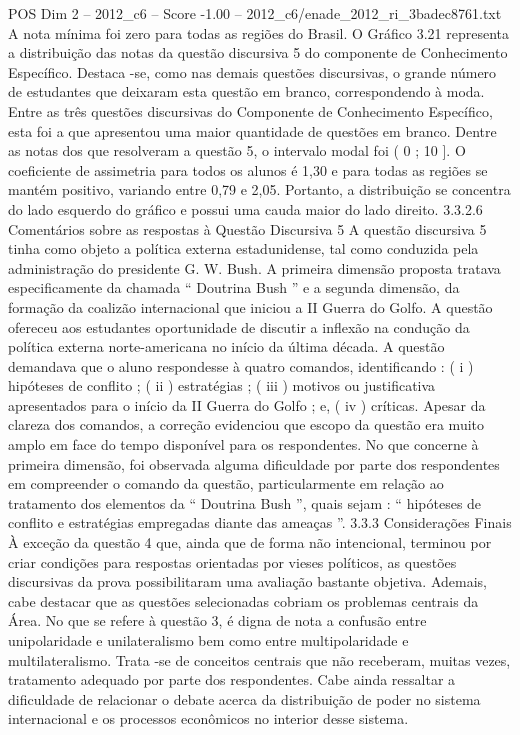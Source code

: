 \begin{textsample}{POS Dim 2 – 2012\_c6 – Score -1.00 – 2012\_c6/enade\_2012\_ri\_3badec8761.txt}
A nota mínima foi zero para todas as regiões do Brasil.
O Gráfico 3.21 representa a distribuição das notas da questão discursiva 5 do componente de Conhecimento Específico.
Destaca -se, como nas demais questões discursivas, o grande número de estudantes que deixaram esta questão em branco, correspondendo à moda.
Entre as três questões discursivas do Componente de Conhecimento Específico, esta foi a que apresentou uma maior quantidade de questões em branco.
Dentre as notas dos que resolveram a questão 5, o intervalo modal foi ( 0 ; 10 ].
O coeficiente de assimetria para todos os alunos é 1,30 e para todas as regiões se mantém positivo, variando entre 0,79 e 2,05.
Portanto, a distribuição se concentra do lado esquerdo do gráfico e possui uma cauda maior do lado direito. 3.3.2.6 Comentários sobre as respostas à Questão Discursiva 5 A questão discursiva 5 tinha como objeto a política externa estadunidense, tal como conduzida pela administração do presidente G.
W.
Bush.
A primeira dimensão proposta tratava especificamente da chamada “ Doutrina Bush ” e a segunda dimensão, da formação da coalizão internacional que iniciou a II Guerra do Golfo.
A questão ofereceu aos estudantes oportunidade de discutir a inflexão na condução da política externa norte-americana no início da última década.
A questão demandava que o aluno respondesse à quatro comandos, identificando : ( i ) hipóteses de conflito ; ( ii ) estratégias ; ( iii ) motivos ou justificativa apresentados para o início da II Guerra do Golfo ; e, ( iv ) críticas.
Apesar da clareza dos comandos, a correção evidenciou que escopo da questão era muito amplo em face do tempo disponível para os respondentes.
No que concerne à primeira dimensão, foi observada alguma dificuldade por parte dos respondentes em compreender o comando da questão, particularmente em relação ao tratamento dos elementos da “ Doutrina Bush ”, quais sejam : “ hipóteses de conflito e estratégias empregadas diante das ameaças ”. 3.3.3 Considerações Finais À exceção da questão 4 que, ainda que de forma não intencional, terminou por criar condições para respostas orientadas por vieses políticos, as questões discursivas da prova possibilitaram uma avaliação bastante objetiva.
Ademais, cabe destacar que as questões selecionadas cobriam os problemas centrais da Área.
No que se refere à questão 3, é digna de nota a confusão entre unipolaridade e unilateralismo bem como entre multipolaridade e multilateralismo.
Trata -se de conceitos centrais que não receberam, muitas vezes, tratamento adequado por parte dos respondentes.
Cabe ainda ressaltar a dificuldade de relacionar o debate acerca da distribuição de poder no sistema internacional e os processos econômicos no interior desse sistema.

\end{textsample}
